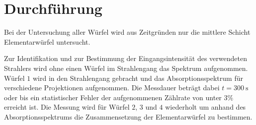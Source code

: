 \section{Durchführung}
\label{sec:Durchführung}

Bei der Untersuchung aller Würfel wird aus Zeitgründen nur die mittlere Schicht Elementarwürfel untersucht.

Zur Identifikation und zur Bestimmung der Eingangsintensität des verwendeten Strahlers wird ohne einen Würfel im Strahlengang das Spektrum aufgenommen.
Würfel $1$ wird in den Strahlengang gebracht und das Absorptionsspektrum für verschiedene Projektionen aufgenommen. Die Messdauer beträgt dabei $t=\SI{300}{\second}$ oder bis ein statistischer Fehler der aufgenommenen Zählrate von unter $3\%$ erreicht ist.
Die Messung wird für Würfel $2$, $3$ und $4$ wiederholt um anhand des Absorptionsspektrums die Zusammensetzung der Elementarwürfel zu bestimmen.